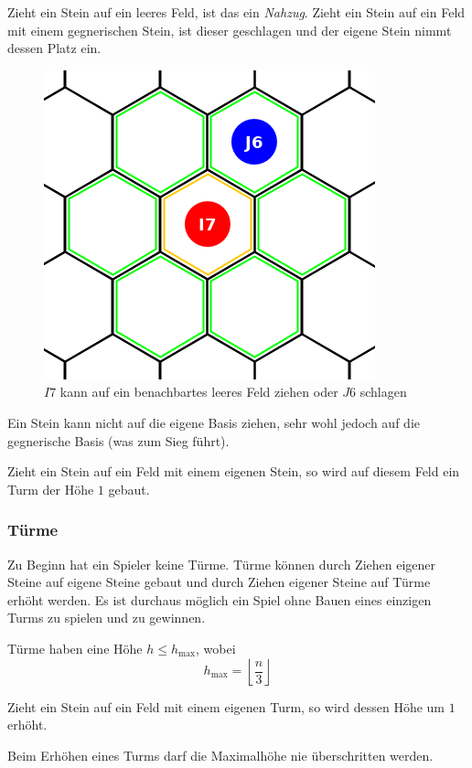 Zieht ein Stein auf ein leeres Feld, ist das ein \emph{Nahzug}. Zieht ein Stein auf ein Feld mit einem gegnerischen Stein, ist dieser geschlagen und der eigene Stein nimmt dessen Platz ein.
\begin{figure}[ht]
\begin{center}
\includegraphics[scale=0.25]{graphic/token-move-kick.png} \\
\smallskip
{\footnotesize $I7$ kann auf ein benachbartes leeres Feld ziehen oder $J6$ schlagen}
\end{center}
\end{figure}

Ein Stein kann nicht auf die eigene Basis ziehen, sehr wohl jedoch auf die gegnerische Basis (was zum Sieg führt).

Zieht ein Stein auf ein Feld mit einem eigenen Stein, so wird auf diesem Feld ein Turm der Höhe $1$ gebaut.

\subsubsection*{Türme}
Zu Beginn hat ein Spieler keine Türme. Türme können durch Ziehen eigener Steine auf eigene Steine gebaut und durch Ziehen eigener Steine auf Türme erhöht werden. Es ist durchaus möglich ein Spiel ohne Bauen eines einzigen Turms zu spielen und zu gewinnen.

Türme haben eine Höhe $h \le h_\text{max}$, wobei \[h_\text{max} = \left\lfloor \frac{n}{3}\right\rfloor\]

Zieht ein Stein auf ein Feld mit einem eigenen Turm, so wird dessen Höhe um $1$ erhöht.

Beim Erhöhen eines Turms darf die Maximalhöhe nie überschritten werden.

